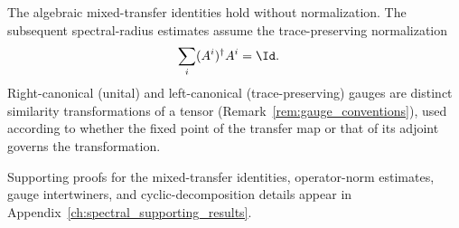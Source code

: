 The algebraic mixed-transfer identities hold without normalization. The
subsequent spectral-radius estimates assume the trace-preserving normalization
\begin{align}
    \sum_i (A^i)^\dagger A^i
     & =\Id.
    \label{eq:spec_tp_normalization}
\end{align}
Right-canonical (unital) and left-canonical (trace-preserving) gauges are
distinct similarity transformations of a tensor (Remark~\ref{rem:gauge_conventions}),
used according to whether the fixed point of the transfer map or that of its adjoint
governs the transformation.

Supporting proofs for the mixed-transfer identities, operator-norm estimates,
gauge intertwiners, and cyclic-decomposition details appear in
Appendix~\ref{ch:spectral_supporting_results}.
